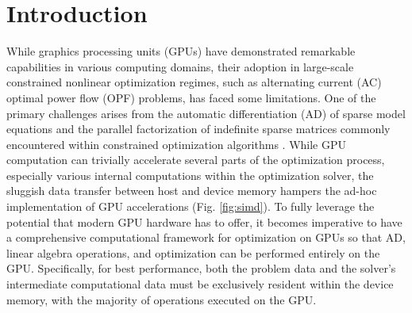 \section{Introduction}

While graphics processing units (GPUs) have demonstrated remarkable
capabilities in various computing domains, their adoption in
large-scale constrained nonlinear optimization regimes, such as
alternating current (AC) optimal power flow (OPF) problems, has faced
some limitations. One of the primary challenges arises from the
automatic differentiation (AD) of sparse model equations and the parallel
factorization of indefinite sparse matrices commonly encountered
within constrained optimization algorithms
\cite{anitescu2021targeting}. While GPU computation can trivially
accelerate several parts of the optimization process, especially
various internal computations within the optimization solver, the
sluggish data transfer between host and device memory hampers the
ad-hoc implementation of GPU accelerations (Fig. \ref{fig:simd}). To
fully leverage the potential that modern GPU hardware has to offer, it
becomes imperative to have a comprehensive computational framework for
optimization on GPUs so that AD, linear algebra
operations, and optimization can be performed entirely on the GPU.
Specifically, for best performance, both the problem data and the
solver's intermediate computational data must be exclusively resident
within the device memory, with the majority of operations executed on
the GPU.

